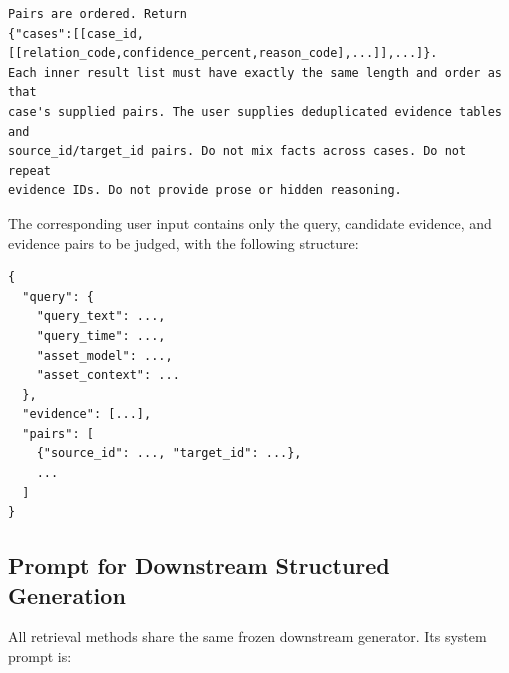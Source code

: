 \begin{lstlisting}
Pairs are ordered. Return
{"cases":[[case_id,[[relation_code,confidence_percent,reason_code],...]],...]}.
Each inner result list must have exactly the same length and order as that
case's supplied pairs. The user supplies deduplicated evidence tables and
source_id/target_id pairs. Do not mix facts across cases. Do not repeat
evidence IDs. Do not provide prose or hidden reasoning.
\end{lstlisting}

The corresponding user input contains only the query, candidate evidence, and evidence pairs to be judged, with the following structure:

\begin{lstlisting}
{
  "query": {
    "query_text": ...,
    "query_time": ...,
    "asset_model": ...,
    "asset_context": ...
  },
  "evidence": [...],
  "pairs": [
    {"source_id": ..., "target_id": ...},
    ...
  ]
}
\end{lstlisting}

\subsection{Prompt for Downstream Structured Generation}
\label{app:generation_prompt}

All retrieval methods share the same frozen downstream generator. Its system prompt is:

